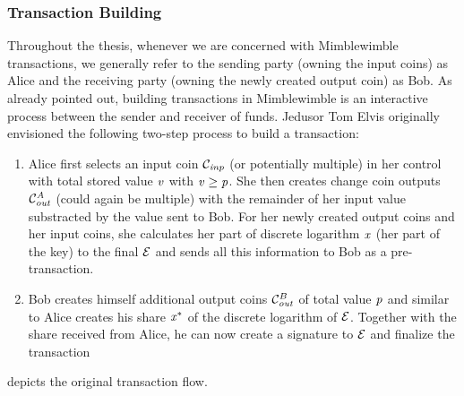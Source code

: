 \subsubsection{Transaction Building} \label{subsec:pre:mimblewimble:txbuild}
Throughout the thesis, whenever we are concerned with Mimblewimble transactions, we generally refer to the sending party (owning the input coins) as Alice and the receiving party (owning the newly created output coin) as Bob.
As already pointed out, building transactions in Mimblewimble is an interactive process between the sender and receiver of funds.
Jedusor Tom Elvis originally envisioned the following two-step process to build a transaction:~\cite{jedusor2016mimblewimble}
\begin{enumerate}
    \item Alice first selects an input coin $\mathcal{C}_{\mathit{inp}}$ (or potentially multiple) in her control with total stored value $\mathit{v}$ with $\mathit{v} \geq \mathit{p}$.
    She then creates change coin outputs $\mathcal{C}_{\mathit{out}}^{\mathit{A}}$ (could again be multiple) with the remainder of her input value substracted by the value sent to Bob.
    For her newly created output coins and her input coins, she calculates her part of discrete logarithm $\mathit{x}$ (her part of the key) to the final $\mathcal{E}$ and sends all this information to Bob as a pre-transaction.
    \item Bob creates himself additional output coins $\mathcal{C}_{\mathit{out}}^B$ of total value $\mathit{p}$ and similar to Alice creates his share $\mathit{x}^*$ of the discrete logarithm of $\mathcal{E}$.
    Together with the share received from Alice, he can now create a signature to $\mathcal{E}$ and finalize the transaction
\end{enumerate}
 depicts the original transaction flow.\\
